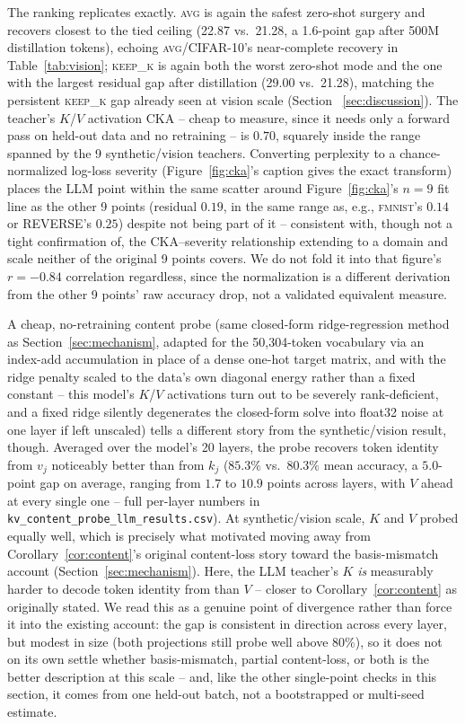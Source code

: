 \documentclass[11pt]{article}
\begin{document}
The ranking replicates exactly. \textsc{avg} is again the safest zero-shot surgery and
recovers closest to the tied ceiling (22.87 vs.\ 21.28, a 1.6-point gap after 500M
distillation tokens), echoing \textsc{avg}/CIFAR-10's near-complete recovery in
Table~\ref{tab:vision}; \textsc{keep\_k} is again both the worst zero-shot mode and the
one with the largest residual gap after distillation (29.00 vs.\ 21.28), matching the
persistent \textsc{keep\_k} gap already seen at vision scale (Section~
\ref{sec:discussion}). The teacher's $K$/$V$ activation CKA -- cheap to measure, since
it needs only a forward pass on held-out data and no retraining -- is $0.70$, squarely
inside the range spanned by the 9 synthetic/vision teachers. Converting perplexity to a
chance-normalized log-loss severity (Figure~\ref{fig:cka}'s caption gives the exact
transform) places the LLM point within the same scatter around Figure~\ref{fig:cka}'s
$n=9$ fit line as the other 9 points (residual $0.19$, in the same range as, e.g.,
\textsc{fmnist}'s $0.14$ or REVERSE's $0.25$) despite not being part of it -- consistent
with, though not a tight confirmation of, the CKA--severity relationship extending to a
domain and scale neither of the original 9 points covers. We do not fold it into that
figure's $r=-0.84$ correlation regardless, since the normalization is a different
derivation from the other 9 points' raw accuracy drop, not a validated equivalent
measure.

A cheap, no-retraining content probe (same closed-form ridge-regression method as
Section~\ref{sec:mechanism}, adapted for the 50{,}304-token vocabulary via an
index-add accumulation in place of a dense one-hot target matrix, and with the ridge
penalty scaled to the data's own diagonal energy rather than a fixed constant --
this model's $K$/$V$ activations turn out to be severely rank-deficient, and a fixed
ridge silently degenerates the closed-form solve into float32 noise at one layer if
left unscaled) tells a different story from the synthetic/vision result, though.
Averaged over the model's 20 layers, the probe recovers token identity from $v_j$
noticeably better than from $k_j$ ($85.3\%$ vs.\ $80.3\%$ mean accuracy, a $5.0$-point
gap on average, ranging from $1.7$ to $10.9$ points across layers, with $V$ ahead at
every single one -- full per-layer numbers in
\texttt{kv\_content\_probe\_llm\_results.csv}). At synthetic/vision scale, $K$ and $V$
probed equally well, which is precisely what motivated moving away from
Corollary~\ref{cor:content}'s original content-loss story toward the basis-mismatch
account (Section~\ref{sec:mechanism}). Here, the LLM teacher's $K$ \emph{is}
measurably harder to decode token identity from than $V$ -- closer to
Corollary~\ref{cor:content} as originally stated. We read this as a genuine point of
divergence rather than force it into the existing account: the gap is consistent in
direction across every layer, but modest in size (both projections still probe well
above 80\%), so it does not on its own settle whether basis-mismatch, partial
content-loss, or both is the better description at this scale -- and, like the other
single-point checks in this section, it comes from one held-out batch, not a
bootstrapped or multi-seed estimate.
\end{document}

